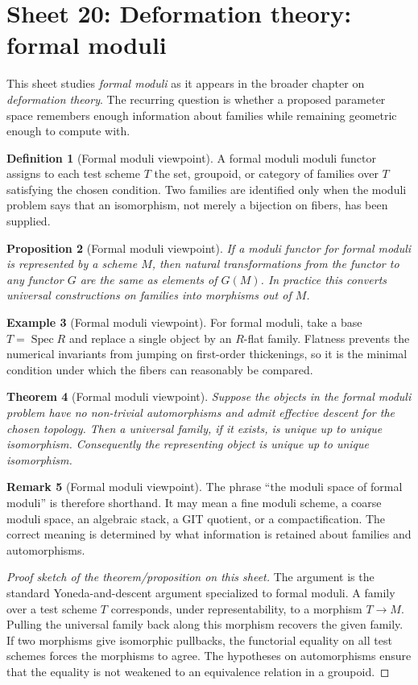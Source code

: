 \documentclass[11pt]{amsart}
\newtheorem{theorem}{Theorem}[section]
\newtheorem{proposition}[theorem]{Proposition}
\theoremstyle{definition}
\newtheorem{definition}[theorem]{Definition}
\newtheorem{example}[theorem]{Example}
\newtheorem{remark}[theorem]{Remark}
\newcommand{\Spec}{\operatorname{Spec}}
\begin{document}
\section{Sheet 20: Deformation theory: formal moduli}
This sheet studies \emph{formal moduli} as it appears in the broader chapter on \emph{deformation theory}.  The recurring question is whether a proposed parameter space remembers enough information about families while remaining geometric enough to compute with.
\begin{definition}[Formal moduli viewpoint]
A formal moduli moduli functor assigns to each test scheme $T$ the set, groupoid, or category of families over $T$ satisfying the chosen condition.  Two families are identified only when the moduli problem says that an isomorphism, not merely a bijection on fibers, has been supplied.
\end{definition}
\begin{proposition}[Formal moduli viewpoint]
If a moduli functor for formal moduli is represented by a scheme $M$, then natural transformations from the functor to any functor $G$ are the same as elements of $G(M)$.  In practice this converts universal constructions on families into morphisms out of $M$.
\end{proposition}
\begin{example}[Formal moduli viewpoint]
For formal moduli, take a base $T=\Spec R$ and replace a single object by an $R$-flat family.  Flatness prevents the numerical invariants from jumping on first-order thickenings, so it is the minimal condition under which the fibers can reasonably be compared.
\end{example}
\begin{theorem}[Formal moduli viewpoint]
Suppose the objects in the formal moduli problem have no non-trivial automorphisms and admit effective descent for the chosen topology.  Then a universal family, if it exists, is unique up to unique isomorphism.  Consequently the representing object is unique up to unique isomorphism.
\end{theorem}
\begin{remark}[Formal moduli viewpoint]
The phrase ``the moduli space of formal moduli'' is therefore shorthand.  It may mean a fine moduli scheme, a coarse moduli space, an algebraic stack, a GIT quotient, or a compactification.  The correct meaning is determined by what information is retained about families and automorphisms.
\end{remark}
\begin{proof}[Proof sketch of the theorem/proposition on this sheet]
The argument is the standard Yoneda-and-descent argument specialized to formal moduli.  A family over a test scheme $T$ corresponds, under representability, to a morphism $T\to M$.  Pulling the universal family back along this morphism recovers the given family.  If two morphisms give isomorphic pullbacks, the functorial equality on all test schemes forces the morphisms to agree.  The hypotheses on automorphisms ensure that the equality is not weakened to an equivalence relation in a groupoid.
\end{proof}
\end{document}
